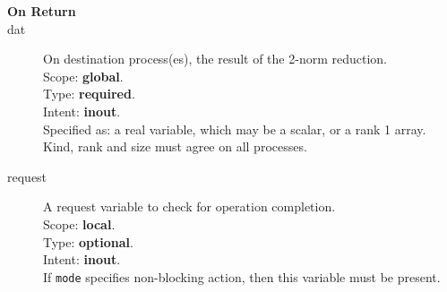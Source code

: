 \begin{description}
\item[\bf On Return]
\item[dat] On destination process(es), the result of the 2-norm reduction.\\
Scope: {\bf global}.\\
Type: {\bf required}.\\
Intent: {\bf inout}.\\
Specified as: a real variable, which may be a
scalar, or a rank 1 array. \\
Kind, rank and size must agree on all processes.
\item[request] A request variable to check for operation completion.\\
Scope: {\bf local}.\\
Type: {\bf optional}.\\
Intent: {\bf inout}.\\
If \verb|mode| specifies non-blocking action, then this
variable must be present.
\end{description}


